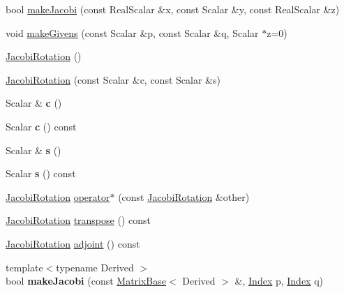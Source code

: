 \begin{DoxyCompactItemize}
\item 
bool \hyperlink{group___jacobi___module_a6572f272cac38e070a99b466dd1fbc74}{make\+Jacobi} (const Real\+Scalar \&x, const Scalar \&y, const Real\+Scalar \&z)
\item 
void \hyperlink{group___jacobi___module_af73c81e9cc139b7e0d877ce553b02ec0}{make\+Givens} (const Scalar \&p, const Scalar \&q, Scalar $\ast$z=0)
\item 
\hyperlink{group___jacobi___module_a38fec2c4da529ef3d05ff37b848b4227}{Jacobi\+Rotation} ()
\item 
\hyperlink{group___jacobi___module_a3e8b5dc0a56f7a2d0f788b1ccb1547cb}{Jacobi\+Rotation} (const Scalar \&c, const Scalar \&s)
\item 
\mbox{\label{group___jacobi___module_af1c132146bc93a872b799bc57d9ced50}} 
Scalar \& {\bfseries c} ()
\item 
\mbox{\label{group___jacobi___module_a1cc768e0ad5492a5656791cb45194184}} 
Scalar {\bfseries c} () const
\item 
\mbox{\label{group___jacobi___module_a2c7a08e2d27875fd770d489317746969}} 
Scalar \& {\bfseries s} ()
\item 
\mbox{\label{group___jacobi___module_ae6f58fffecb41adb8d037c385b856628}} 
Scalar {\bfseries s} () const
\item 
\hyperlink{group___jacobi___module_class_eigen_1_1_jacobi_rotation}{Jacobi\+Rotation} \hyperlink{group___jacobi___module_ada8389f291839964d7b481464f0e4e94}{operator$\ast$} (const \hyperlink{group___jacobi___module_class_eigen_1_1_jacobi_rotation}{Jacobi\+Rotation} \&other)
\item 
\hyperlink{group___jacobi___module_class_eigen_1_1_jacobi_rotation}{Jacobi\+Rotation} \hyperlink{group___jacobi___module_ab40e9cdc4582593511e57ee896e055a2}{transpose} () const
\item 
\hyperlink{group___jacobi___module_class_eigen_1_1_jacobi_rotation}{Jacobi\+Rotation} \hyperlink{group___jacobi___module_a89c8ea615f8fa77ddd5810a1e5fde4da}{adjoint} () const
\item 
\mbox{\label{group___jacobi___module_a69076401f22e883dc76b6ff9074ac669}} 
{\footnotesize template$<$typename Derived $>$ }\\bool {\bfseries make\+Jacobi} (const \hyperlink{group___core___module_class_eigen_1_1_matrix_base}{Matrix\+Base}$<$ Derived $>$ \&, \hyperlink{namespace_eigen_a62e77e0933482dafde8fe197d9a2cfde}{Index} p, \hyperlink{namespace_eigen_a62e77e0933482dafde8fe197d9a2cfde}{Index} q)

\end{DoxyCompactItemize}
